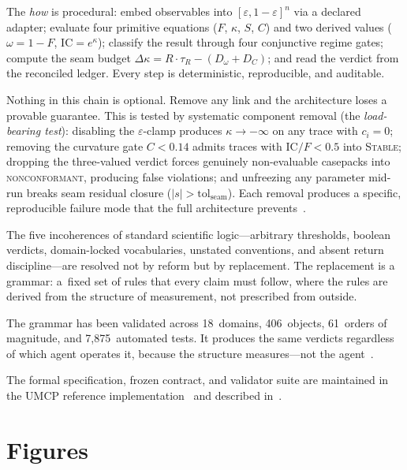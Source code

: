 \documentclass[
  aps,
  prd,
  twocolumn,
  superscriptaddress,
  nofootinbib,
  floatfix
]{revtex4-2}
\newcommand{\tR}{\tau_{\!R}}
\newcommand{\eps}{\varepsilon}
\newcommand{\tolseam}{\mathrm{tol}_{\mathrm{seam}}}
\newcommand{\regime}[1]{\textrm{\upshape\scshape#1}}
\newcommand{\IC}{\mathrm{IC}}
\begin{document}
The \emph{how} is procedural: embed observables into
$[\eps, 1{-}\eps]^n$ via a declared adapter; evaluate
four primitive equations ($F$, $\kappa$, $S$, $C$) and two
derived values ($\omega = 1 - F$, $\IC = e^\kappa$); classify
the result through four conjunctive regime gates; compute the
seam budget $\Delta\kappa = R \cdot \tR - (D_\omega + D_C)$;
and read the verdict from the reconciled ledger.  Every
step is deterministic, reproducible, and auditable.

Nothing in this chain is optional.  Remove any link and the
architecture loses a provable guarantee.  This is tested by
systematic component removal (the \emph{load-bearing test}):
disabling the $\eps$-clamp produces $\kappa \to -\infty$ on
any trace with $c_i = 0$; removing the curvature gate $C < 0.14$
admits traces with $\IC/F < 0.5$ into \regime{Stable}; dropping
the three-valued verdict forces genuinely non-evaluable
casepacks into \regime{nonconformant}, producing false
violations; and unfreezing any parameter mid-run breaks seam
residual closure ($|s| > \tolseam$).  Each removal produces a
specific, reproducible failure mode that the full architecture
prevents~\cite{umcpmetadatarepo}.

The five incoherences of standard scientific
logic---arbitrary thresholds, boolean verdicts, domain-locked
vocabularies, unstated conventions, and absent return
discipline---are resolved not by reform but by replacement.
The replacement is a grammar: a~fixed set of rules that
every claim must follow, where the rules are derived from
the structure of measurement, not prescribed from outside.

The grammar has been validated across 18~domains, 406~objects,
61~orders of magnitude, and 7{,}875~automated tests.  It produces
the same verdicts regardless of which agent operates it, because
the structure measures---not the agent~\cite{paulus2025umcp}.

\begin{acknowledgments}
The formal specification, frozen contract, and validator suite are
maintained in the UMCP reference
implementation~\cite{umcpmetadatarepo} and described
in~\cite{paulus2025umcp,paulus2025episteme}.
\end{acknowledgments}

\appendix
\onecolumngrid
\section{Figures}\label{app:figures}
\end{document}
